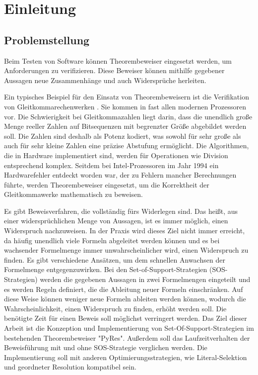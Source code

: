 
\chapter{Einleitung}
\section{Problemstellung}
Beim Testen von Software können Theorembeweiser eingesetzt werden, um Anforderungen zu verifizieren. Diese Beweiser können mithilfe gegebener Aussagen neue Zusammenhänge und auch Widersprüche herleiten.

Ein typisches Beispiel für den Einsatz von Theorembeweisern ist die Verifikation von Gleitkommarechenwerken \cite{Harrison2006Float}. Sie kommen in fast allen modernen Prozessoren vor. Die Schwierigkeit bei Gleitkommazahlen liegt darin, dass die unendlich große Menge reeller Zahlen auf Bitsequenzen mit begrenzter Größe abgebildet werden soll. Die Zahlen sind deshalb als Potenz kodiert, was sowohl für sehr große als auch für sehr kleine Zahlen eine präzise Abstufung ermöglicht. Die Algorithmen, die in Hardware implementiert sind, werden für Operationen wie Division entsprechend komplex. Seitdem bei Intel-Prozessoren im Jahr 1994 ein Hardwarefehler entdeckt worden war, der zu Fehlern mancher Berechnungen führte, werden Theorembeweiser eingesetzt, um die Korrektheit der Gleitkommawerke mathematisch zu beweisen. \cite{WillkommIntel} 

Es gibt Beweisverfahren, die vollständig fürs Widerlegen sind. Das heißt, aus einer widersprüchlichen Menge von Aussagen, ist es immer möglich, einen Widerspruch nachzuweisen. In der Praxis wird dieses Ziel nicht immer erreicht, da häufig unendlich viele Formeln abgeleitet werden können und es bei wachsender Formelmenge immer unwahrscheinlicher wird, einen Widerspruch zu finden. Es gibt verschiedene Ansätzen, um dem schnellen Anwachsen der Formelmenge entgegenzuwirken. Bei den Set-of-Support-Strategien (SOS-Strategien) werden die gegebenen Aussagen in zwei Formelmengen eingeteilt und es werden Regeln definiert, die die Ableitung neuer Formeln einschränken. Auf diese Weise können weniger neue Formeln ableiten werden können, wodurch die Wahrscheinlichkeit, einen Widerspruch zu finden, erhöht werden soll. Die benötigte Zeit für einen Beweis soll möglichst verringert werden.
Das Ziel dieser Arbeit ist die Konzeption und Implementierung von Set-Of-Support-Strategien im bestehenden Theorembeweiser "PyRes". Außerdem soll das Laufzeitverhalten der Beweisführung mit und ohne SOS-Strategie verglichen werden. Die Implementierung soll mit anderen Optimierungsstrategien, wie Literal-Selektion und geordneter Resolution kompatibel sein.

